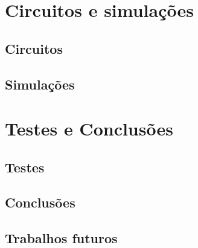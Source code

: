 \documentclass{beamer}
\begin{document}
\section{Circuitos e simulações}
	\subsection{Circuitos}
	\subsection{Simulações}

\section{Testes e Conclusões}
	\subsection{Testes}
	\subsection{Conclusões}
	\subsection{Trabalhos futuros}

\begin{frame}	%
\end{frame} 	%
\end{document}
